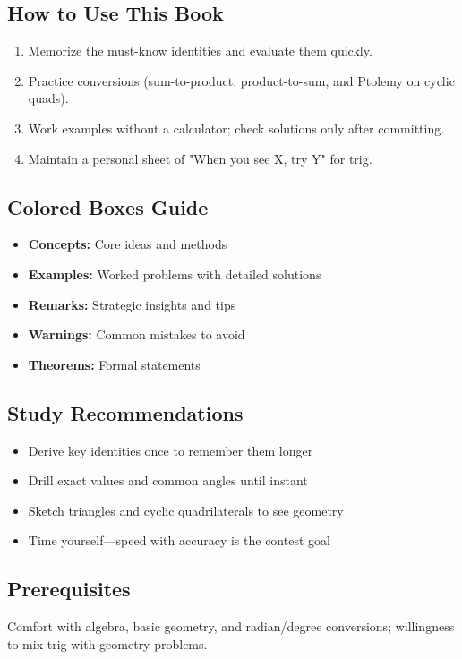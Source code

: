 \documentclass[12pt]{extarticle}
\begin{document}
\subsection*{How to Use This Book}
\begin{enumerate}
  \item Memorize the must-know identities and evaluate them quickly.
  \item Practice conversions (sum-to-product, product-to-sum, and Ptolemy on cyclic quads).
  \item Work examples without a calculator; check solutions only after committing.
  \item Maintain a personal sheet of "When you see X, try Y" for trig.
\end{enumerate}

\subsection*{Colored Boxes Guide}
\begin{itemize}
  \item \textcolor{blue!75!black}{\textbf{Concepts:}} Core ideas and methods
  \item \textcolor{orange!75!black}{\textbf{Examples:}} Worked problems with detailed solutions
  \item \textcolor{green!60!black}{\textbf{Remarks:}} Strategic insights and tips
  \item \textcolor{red!75!black}{\textbf{Warnings:}} Common mistakes to avoid
  \item \textcolor{purple!75!black}{\textbf{Theorems:}} Formal statements
\end{itemize}

\subsection*{Study Recommendations}
\begin{itemize}
  \item Derive key identities once to remember them longer
  \item Drill exact values and common angles until instant
  \item Sketch triangles and cyclic quadrilaterals to see geometry
  \item Time yourself—speed with accuracy is the contest goal
\end{itemize}

\subsection*{Prerequisites}
Comfort with algebra, basic geometry, and radian/degree conversions; willingness to mix trig with geometry problems.
\end{document}
